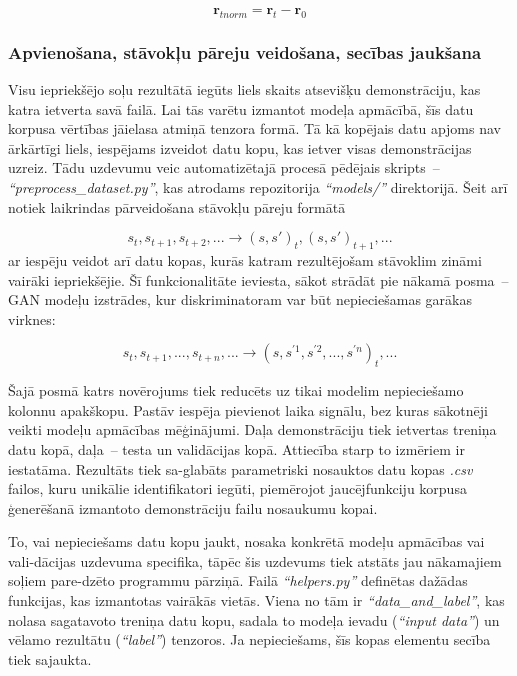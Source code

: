\documentclass[12pt, a4paper]{article}
\numberwithin{equation}{section} %
\begin{document}
\begin{equation}
     \boldsymbol{r}_{tnorm} =  \boldsymbol{r}_t -  \boldsymbol{r}_0
\end{equation}

\subsubsection{Apvienošana, stāvokļu pāreju veidošana, secības jaukšana}

Visu iepriekšējo soļu rezultātā iegūts liels skaits atsevišķu demonstrāciju, kas katra ietverta savā failā. Lai tās varētu izmantot modeļa apmācībā, šīs datu korpusa vērtības jāielasa atmiņā tenzora formā. Tā kā kopējais datu apjoms nav ārkārtīgi liels, iespējams izveidot datu kopu, kas ietver visas demonstrācijas uzreiz. Tādu uzdevumu veic automatizētajā procesā pēdējais skripts~-- \textit{``preprocess\_dataset.py''}, kas atrodams repozitorija \textit{``models/''} direktorijā. Šeit arī notiek laikrindas pārveidošana stāvokļu pāreju formātā

\begin{equation}
    s_t, s_{t+1}, s_{t+2}, ... \rightarrow (s,s')_t, (s,s')_{t+1}, ...
\end{equation}
ar iespēju veidot arī datu kopas, kurās katram rezultējošam stāvoklim zināmi vairāki iepriekšējie. Šī funkcionalitāte ieviesta, sākot strādāt pie nākamā posma~-- GAN modeļu izstrādes, kur diskriminatoram var būt nepieciešamas garākas virknes:

\begin{equation}
    s_t, s_{t+1}, ..., s_{t+n}, ... \rightarrow (s,s^{'1}, s^{'2}, ..., s^{'n})_t, ...
\end{equation}

Šajā posmā katrs novērojums tiek reducēts uz tikai modelim nepieciešamo kolonnu apakškopu. Pastāv iespēja pievienot laika signālu, bez kuras sākotnēji veikti modeļu apmācības mēģinājumi. Daļa demonstrāciju tiek ietvertas treniņa datu kopā, daļa~-- testa un validācijas kopā. Attiecība starp to izmēriem ir iestatāma. Rezultāts tiek sa-glabāts parametriski nosauktos datu kopas \textit{.csv} failos, kuru unikālie identifikatori iegūti, piemērojot jaucējfunkciju korpusa ģenerēšanā izmantoto demonstrāciju failu nosaukumu kopai.

To, vai nepieciešams datu kopu jaukt, nosaka konkrētā modeļu apmācības vai vali-dācijas uzdevuma specifika, tāpēc šis uzdevums tiek atstāts jau nākamajiem soļiem pare-dzēto programmu pārziņā. Failā \textit{``helpers.py''} definētas dažādas funkcijas, kas izmantotas vairākās vietās. Viena no tām ir \textit{``data\_and\_label''}, kas nolasa sagatavoto treniņa datu kopu, sadala to modeļa ievadu (\textit{``input data''}) un vēlamo rezultātu (\textit{``label''}) tenzoros. Ja nepieciešams, šīs kopas elementu secība tiek sajaukta.
\end{document}
